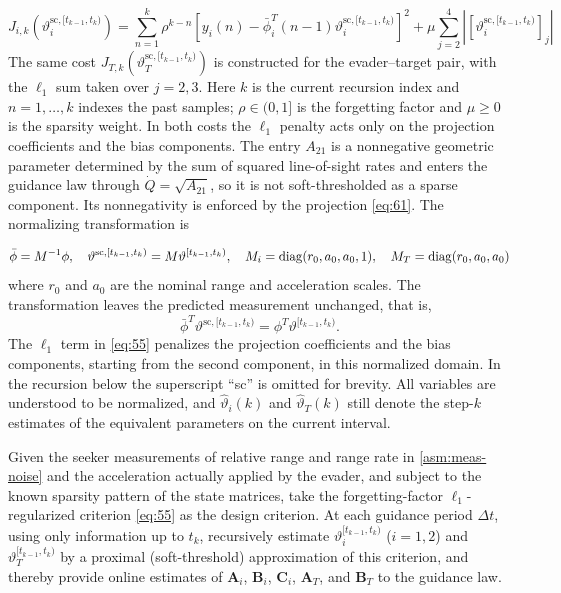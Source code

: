 \begin{equation}
\label{eq:55}
{J_{i,k}}\left(\vartheta _i^{{\text{sc}},[{t_{k - 1}},{t_k})}\right) = \sum\limits_{n = 1}^k {{\rho ^{k - n}}} {\left[ {{y_i}(n) - \bar{\phi}_i^T(n - 1)\vartheta _i^{{\text{sc}},[{t_{k - 1}},{t_k})}} \right]^2} + \mu \sum\limits_{j = 2}^4 {\left| {{[\vartheta _i^{{\text{sc}},[{t_{k - 1}},{t_k})}]}_j} \right|}
\end{equation}
The same cost ${J_{T,k}}\left(\vartheta _T^{{\text{sc}},[{t_{k - 1}},{t_k})}\right)$ is constructed for the evader--target pair, with the ${\ell _1}$ sum taken over $j = 2,3$. Here $k$ is the current recursion index and $n=1,\ldots,k$ indexes the past samples; $\rho  \in (0,1]$ is the forgetting factor and $\mu  \geqslant 0$ is the sparsity weight. In both costs the ${\ell _1}$ penalty acts only on the projection coefficients and the bias components. The entry ${A_{21}}$ is a nonnegative geometric parameter determined by the sum of squared line-of-sight rates and enters the guidance law through $\dot Q=\sqrt{A_{21}}$, so it is not soft-thresholded as a sparse component. Its nonnegativity is enforced by the projection \eqref{eq:61}. The normalizing transformation is

\begin{equation}
\label{eq:56}
\bar{\phi} = {M^{ - 1}}\phi ,\quad \vartheta ^{{\text{sc}},[{t_{k - 1}},{t_k})} = M\vartheta ^{[{t_{k - 1}},{t_k})},\quad {M_i} = \operatorname{diag}({r_0},{a_0},{a_0},1),\quad {M_T} = \operatorname{diag}({r_0},{a_0},{a_0})
\end{equation}
where ${r_0}$ and ${a_0}$ are the nominal range and acceleration scales. The transformation leaves the predicted measurement unchanged, that is,
\[
\bar{\phi}^{T}\vartheta ^{{\text{sc}},[{t_{k - 1}},{t_k})}
= {\phi ^T}\vartheta ^{[{t_{k - 1}},{t_k})}.
\]
The ${\ell _1}$ term in \eqref{eq:55} penalizes the projection coefficients and the bias components, starting from the second component, in this normalized domain. In the recursion below the superscript ``sc'' is omitted for brevity. All variables are understood to be normalized, and $\hat{\vartheta}_{i}(k)$ and $\hat{\vartheta}_{T}(k)$ still denote the step-$k$ estimates of the equivalent parameters on the current interval.

\begin{problem}
\label{prb:id}
Given the seeker measurements of relative range and range rate in \cref{asm:meas-noise} and the acceleration actually applied by the evader, and subject to the known sparsity pattern of the state matrices, take the forgetting-factor ${\ell _1}$-regularized criterion \eqref{eq:55} as the design criterion. At each guidance period $\Delta t$, using only information up to ${t_k}$, recursively estimate $\vartheta _i^{[{t_{k - 1}},{t_k})}$ ($i = 1,2$) and $\vartheta _T^{[{t_{k - 1}},{t_k})}$ by a proximal (soft-threshold) approximation of this criterion, and thereby provide online estimates of ${{\mathbf{A}}_i}$, ${{\mathbf{B}}_i}$, ${{\mathbf{C}}_i}$, ${{\mathbf{A}}_T}$, and ${{\mathbf{B}}_T}$ to the guidance law.
\end{problem}

